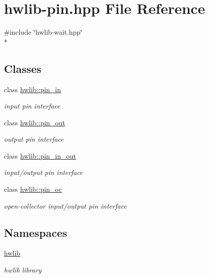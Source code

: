 \hypertarget{hwlib-pin_8hpp}{}\section{hwlib-\/pin.hpp File Reference}
\label{hwlib-pin_8hpp}
{\ttfamily \#include \char`\"{}hwlib-\/wait.\+hpp\char`\"{}}\\*
\subsection*{Classes}
\begin{DoxyCompactItemize}
\item 
class \hyperlink{classhwlib_1_1pin__in}{hwlib\+::pin\+\_\+in}
\begin{DoxyCompactList}\small\item\em input pin interface \end{DoxyCompactList}\item 
class \hyperlink{classhwlib_1_1pin__out}{hwlib\+::pin\+\_\+out}
\begin{DoxyCompactList}\small\item\em output pin interface \end{DoxyCompactList}\item 
class \hyperlink{classhwlib_1_1pin__in__out}{hwlib\+::pin\+\_\+in\+\_\+out}
\begin{DoxyCompactList}\small\item\em input/output pin interface \end{DoxyCompactList}\item 
class \hyperlink{classhwlib_1_1pin__oc}{hwlib\+::pin\+\_\+oc}
\begin{DoxyCompactList}\small\item\em open-\/collector input/output pin interface \end{DoxyCompactList}\end{DoxyCompactItemize}
\subsection*{Namespaces}
\begin{DoxyCompactItemize}
\item 
 \hyperlink{namespacehwlib}{hwlib}
\begin{DoxyCompactList}\small\item\em hwlib library \end{DoxyCompactList}\end{DoxyCompactItemize}
